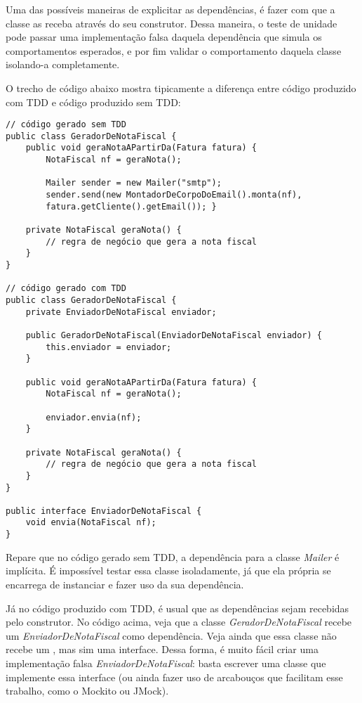 Uma das possíveis maneiras de explicitar as dependências, é fazer com que a
classe as receba através do seu construtor. Dessa maneira, o teste de unidade
pode passar uma implementação falsa daquela dependência que simula os
comportamentos esperados, e por fim validar o comportamento daquela classe
isolando-a completamente.

O trecho de código abaixo mostra tipicamente a diferença entre código produzido
com TDD e código produzido sem TDD:

\begin{lstlisting}[frame=trbl]
// código gerado sem TDD
public class GeradorDeNotaFiscal {
	public void geraNotaAPartirDa(Fatura fatura) {
		NotaFiscal nf = geraNota(); 
		
		Mailer sender = new Mailer("smtp");
		sender.send(new MontadorDeCorpoDoEmail().monta(nf),
		fatura.getCliente().getEmail()); }
	
	private NotaFiscal geraNota() {
		// regra de negócio que gera a nota fiscal
	}
}

// código gerado com TDD
public class GeradorDeNotaFiscal {
	private EnviadorDeNotaFiscal enviador;
	
	public GeradorDeNotaFiscal(EnviadorDeNotaFiscal enviador) {
		this.enviador = enviador;
	}
	
	public void geraNotaAPartirDa(Fatura fatura) {
		NotaFiscal nf = geraNota(); 
		
		enviador.envia(nf);
	}
	
	private NotaFiscal geraNota() {
		// regra de negócio que gera a nota fiscal
	}
}

public interface EnviadorDeNotaFiscal {
	void envia(NotaFiscal nf);
}
\end{lstlisting}

Repare que no código gerado sem TDD, a dependência para a classe \textit{Mailer}
é implícita. É impossível testar essa classe isoladamente, já que ela própria se
encarrega de instanciar e fazer uso da sua dependência. 

Já no código produzido com TDD, é usual que as dependências sejam recebidas pelo
construtor. No código acima, veja que a classe \textit{GeradorDeNotaFiscal}
recebe um \textit{EnviadorDeNotaFiscal} como dependência. Veja ainda que essa
classe não recebe um , mas sim uma interface. Dessa forma, é muito
fácil criar uma implementação falsa \textit{EnviadorDeNotaFiscal}: basta
escrever uma classe que implemente essa interface (ou ainda fazer uso de
arcabouços que facilitam esse trabalho, como o Mockito ou JMock).


